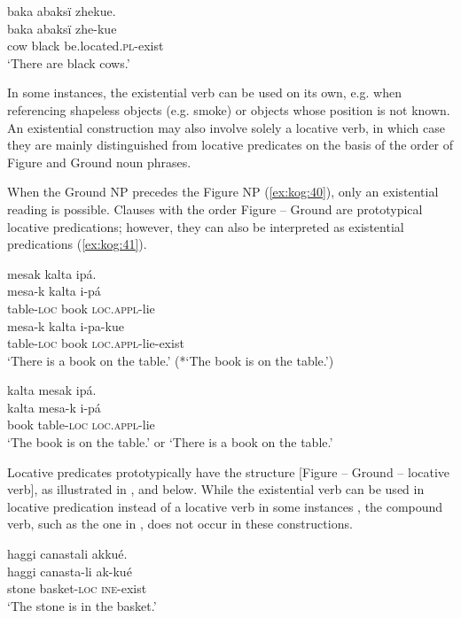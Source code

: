 \documentclass[output=paper,colorlinks,citecolor=brown]{langscibook}
\begin{document}
\ea\label{ex:kog:39}baka abaksï zhekue.\\
    \gll baka abaksï zhe-kue\\
         cow black be.located.\textsc{pl-}exist\\
    \glt‘There are black cows.’
\z 

In some instances, the existential verb can be used on its own, e.g. when referencing shapeless objects (e.g. smoke) or objects whose position is not known. An existential construction may also involve solely a locative verb, in which case they are mainly distinguished from locative predicates on the basis of the order of Figure and Ground noun phrases.

When the Ground NP precedes the Figure NP (\ref{ex:kog:40}), only an existential reading is possible. Clauses with the order Figure – Ground are prototypical locative predications; however, they can also be interpreted as existential predications (\ref{ex:kog:41}). 

\ea\label{ex:kog:40}mesak kalta ipá.\\
  \ea \gll mesa-k kalta i{}-pá \\
         table-\textsc{loc} book \textsc{loc.appl-}lie \\
  \ex \gll mesa-k kalta i{}-pa-kue\\
         table-\textsc{loc} book \textsc{loc.appl-}lie\textsc{{}-}exist \\
    \glt ‘There is a book on the table.’ (*‘The book is on the table.’)
  \z 
\z 

\ea\label{ex:kog:41}kalta mesak ipá.\\
    \gll kalta mesa-k i{}-pá\\
         book table-\textsc{loc} \textsc{loc.appl-}lie\\
    \glt‘The book is on the table.’ or ‘There is a book on the table.’
\z 

Locative predicates prototypically have the structure [Figure – Ground – locative verb], as illustrated in , and  below. While the existential verb can be used in locative predication instead of a locative verb in some instances , the compound verb, such as the one in , does not occur in these constructions. 

\ea\label{ex:kog:42}haggi canastali akkué.\\
    \gll haggi canasta{}-li ak{}-kué\\
         stone basket-\textsc{loc} \textsc{ine{}-}exist\\
    \glt‘The stone is in the basket.’
\z 
\end{document}
